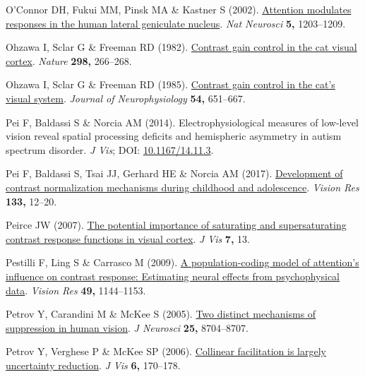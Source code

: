 \documentclass[
  letterpaper,
  DIV=11,
  numbers=noendperiod]{scrartcl}
\newlength{\cslhangindent}
\newenvironment{CSLReferences}[2] %
 {\begin{list}{}{%
  \setlength{\itemindent}{0pt}
  \setlength{\leftmargin}{0pt}
  \setlength{\parsep}{0pt}
  \ifodd #1
   \setlength{\leftmargin}{\cslhangindent}
   \setlength{\itemindent}{-1\cslhangindent}
  \fi
  \setlength{\itemsep}{#2\baselineskip}}}
 {\end{list}}
\begin{document}
\begin{CSLReferences}{1}{1}
O'Connor DH, Fukui MM, Pinsk MA \& Kastner S (2002).
\href{https://doi.org/10.1038/nn957}{Attention modulates responses in
the human lateral geniculate nucleus}. \emph{Nat Neurosci} \textbf{5,}
1203--1209.

Ohzawa I, Sclar G \& Freeman RD (1982).
\href{https://doi.org/10.1038/298266a0}{Contrast gain control in the cat
visual cortex}. \emph{Nature} \textbf{298,} 266--268.

Ohzawa I, Sclar G \& Freeman RD (1985).
\href{https://doi.org/10.1152/jn.1985.54.3.651}{Contrast gain control in
the cat's visual system}. \emph{Journal of Neurophysiology} \textbf{54,}
651--667.

Pei F, Baldassi S \& Norcia AM (2014). Electrophysiological measures of
low-level vision reveal spatial processing deficits and hemispheric
asymmetry in autism spectrum disorder. \emph{J Vis}; DOI:
\href{https://doi.org/10.1167/14.11.3}{10.1167/14.11.3}.

Pei F, Baldassi S, Tsai JJ, Gerhard HE \& Norcia AM (2017).
\href{https://doi.org/10.1016/j.visres.2016.03.010}{Development of
contrast normalization mechanisms during childhood and adolescence}.
\emph{Vision Res} \textbf{133,} 12--20.

Peirce JW (2007). \href{https://doi.org/10.1167/7.6.13}{The potential
importance of saturating and supersaturating contrast response functions
in visual cortex}. \emph{J Vis} \textbf{7,} 13.

Pestilli F, Ling S \& Carrasco M (2009).
\href{https://doi.org/10.1016/j.visres.2008.09.018}{A population-coding
model of attention's influence on contrast response: Estimating neural
effects from psychophysical data}. \emph{Vision Res} \textbf{49,}
1144--1153.

Petrov Y, Carandini M \& McKee S (2005).
\href{https://doi.org/10.1523/JNEUROSCI.2871-05.2005}{Two distinct
mechanisms of suppression in human vision}. \emph{J Neurosci}
\textbf{25,} 8704--8707.

Petrov Y, Verghese P \& McKee SP (2006).
\href{https://doi.org/10.1167/6.2.8}{Collinear facilitation is largely
uncertainty reduction}. \emph{J Vis} \textbf{6,} 170--178.


\end{CSLReferences}
\end{document}
